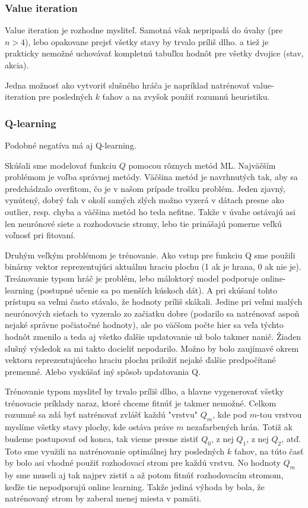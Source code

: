 \documentclass[10pt,a4paper]{article}
\begin{document}
\subsubsection{Value iteration} 
Value iteration je rozhodne mysliteľ. 
Samotná však nepripadá do úvahy (pre $n>4$), lebo opakovane prejsť všetky stavy by trvalo príliš dlho.
a tiež je prakticky nemožné uchovávať kompletnú tabuľku hodnôt pre všetky dvojice (stav, akcia). 

Jedna možnosť ako vytvoriť slušného hráča je napríklad natrénovať value-iteration pre posledných $k$ ťahov a na zvyšok použiť rozumnú heuristiku.



\subsubsection{Q-learning}
Podobné negatíva má aj Q-learning. 

Skúšali sme modelovať funkciu $Q$ pomocou rôznych metód ML. 
Najväčším problémom je voľba správnej metódy. Väčšina metód je navrhnutých tak, aby sa predchádzalo overfitom, čo je v našom prípade trošku problém. 
Jeden zjavný, vynútený, dobrý ťah v okolí samých zlých možno vyzerá v dátach presne ako outlier, resp. chyba 
a väčšina metód ho teda nefitne. 
Takže v úvahe ostávajú asi len neurónové siete a rozhodovacie stromy, lebo tie prinášajú pomerne veľkú voľnosť pri fitovaní.

Druhým veľkým problémom je trénovanie. Ako vstup pre funkciu Q sme použili binárny vektor reprezentujúci aktuálnu hraciu plochu (1 ak je hrana, 0 ak nie je).  
Treánovanie typom hráč je problém, lebo máloktorý model podporuje online-learning (postupné učenie sa po menších kúskoch dát). 
A pri skúšaní tohto prístupu sa veľmi často stávalo, že hodnoty príliš skákali. 
Jedine pri veľmi malých neurónových sieťach to vyzeralo zo začiatku dobre (podarilo sa natrénovať aspoň nejaké správne počiatočné hodnoty), 
ale po väčšom počte hier sa veľa týchto hodnôt zmenilo a teda aj všetko ďalšie updatovanie už bolo takmer nanič. Žiaden slušný výsledok sa mi takto docieliť nepodarilo. Možno by bolo zaujímavé okrem vektoru reprezentujúceho hraciu plochu priložiť nejaké ďalšie predpočítané premenné. Alebo vyskúšať iný spôsob updatovania Q.

Trénovanie typom mysliteľ by trvalo príliš dlho, a hlavne vygenerovať všetky trénovacie príklady naraz, ktoré chceme fitnúť je takmer nemožné.
Celkom rozumné sa zdá byť natrénovať zvlášť každú "vrstvu" $Q_m$, kde pod $m$-tou vrstvou myslíme všetky stavy plochy, kde ostáva práve $m$ nezafarbených hrán. Totiž ak budeme postupovať od konca, tak vieme presne zistiť $Q_0$, z nej $Q_1$, z nej $Q_2$, atď. Toto sme využili na natrénovanie optimálnej hry posledných $k$ ťahov, na túto časť by bolo asi vhodné použiť rozhodovací strom pre každú vrstvu. No hodnoty $Q_m$ by sme museli aj tak najprv zistiť a až potom fitnúť rozhodovacím stromom, keďže tie nepodporujú online learning. Takže jediná výhoda by bola, že natrénovaný strom by zaberal menej miesta v pamäti.
\end{document}
